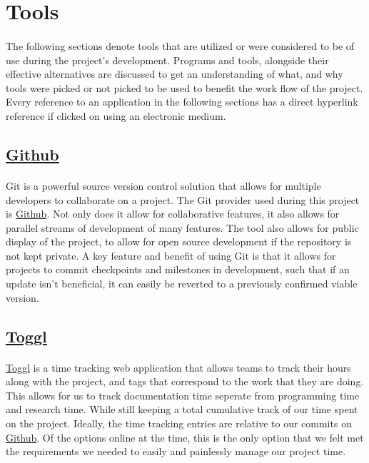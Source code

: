 \documentclass[12pt]{article}
\begin{document}
\newpage

\section{Tools}
\paragraph{}	The following sections denote tools that are utilized or were considered to be of use during the project's development. Programs and tools, alongside their effective alternatives are discussed to get an understanding of what, and why tools were picked or not picked to be used to benefit the work flow of the project. Every reference to an application in the following sections has a direct hyperlink reference if clicked on using an electronic medium.

\subsection{\href{https://Github.com}{Github}}
\paragraph{}	Git is a powerful source version control solution that allows for multiple developers to collaborate on  a project. The Git provider used during this project is \href{https://Github.com}{Github}. Not only does it allow for collaborative features, it also allows for parallel streams of development of many features. The tool also allows for public display of the project, to allow for open source development if the repository is not kept private. A key feature and benefit of using Git is that it allows for projects to commit checkpoints and milestones in development, such that if an update isn't beneficial, it can easily be reverted to a previously confirmed viable version.

\subsection{\href{https://toggl.com}{Toggl}}
\paragraph{}	\href{https://toggl.com}{Toggl} is a time tracking web application that allows teams to track their hours along with the project, and tags that correspond to the work that they are doing. This allows for us to track documentation time seperate from programming time and research time. While still keeping a total cumulative track of our time spent on the project. Ideally, the time tracking entries are relative to our commits on \href{https://Github.com}{Github}. Of the options online at the time, this is the only option that we felt met the requirements we needed to easily and painlessly manage our project time.
\end{document}
